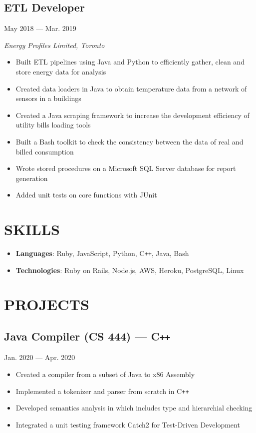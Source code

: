 \documentclass[11pt]{extarticle}
\newcommand{\resumeSub}[2]{
\subsection*{#1} \hfill {#2}
}
\begin{document}
\resumeSub{ETL Developer}{May 2018 --- Mar. 2019}

\textit{Energy Profiles Limited, Toronto}
\begin{itemize}
  \item Built ETL pipelines using Java and Python to efficiently gather, clean and store energy data for analysis
  \item Created data loaders in Java to obtain temperature data from a network of sensors in a buildings
  \item Created a Java scraping framework to increase the development efficiency of utility bills loading tools
  \item Built a Bash toolkit to check the consistency between the data of real and billed consumption
  \item Wrote stored procedures on a Microsoft SQL Server database for report generation
  \item Added unit tests on core functions with JUnit
\end{itemize}

\section*{SKILLS}
\begin{itemize}
  \item \textbf{Languages}: Ruby, JavaScript, Python, C\texttt{++}, Java, Bash
  \item \textbf{Technologies}: Ruby on Rails, Node.js, AWS, Heroku, PostgreSQL, Linux
\end{itemize}

\section*{PROJECTS}
\subsection*{Java Compiler (CS 444) --- C\texttt{++}} \hfill Jan. 2020 --- Apr. 2020

\begin{itemize}
  \item Created a compiler from a subset of Java to x86 Assembly
  \item Implemented a tokenizer and parser from scratch in
    C\texttt{++}
  \item Developed semantics analysis in which includes
    type and hierarchial checking
  \item Integrated a unit testing framework Catch2
    for Test-Driven Development
\end{itemize}
\end{document}
